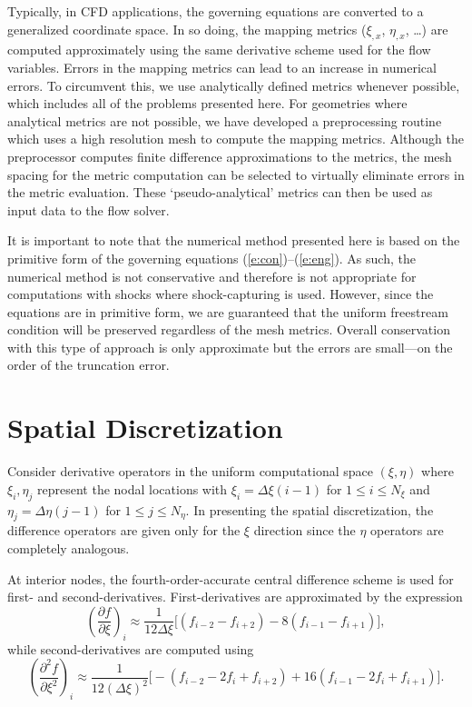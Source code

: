 Typically, in CFD applications, the governing equations are converted to a
generalized coordinate space.  In so doing, the mapping metrics ($\xi_{,x}$,
$\eta_{,x}$, \ldots) are computed approximately using the same derivative
scheme used for the flow variables.  Errors in the mapping metrics can lead to
an increase in numerical errors.  To circumvent this, we use analytically
defined metrics whenever possible, which includes all of the problems
presented here. For geometries where analytical metrics are not possible, we
have developed a preprocessing routine which uses a high resolution mesh to
compute the mapping metrics.  Although the preprocessor computes finite
difference approximations to the metrics, the mesh spacing for the metric
computation can be selected to virtually eliminate errors in the metric
evaluation.  These `pseudo-analytical' metrics can then be used as input data
to the flow solver.

It is important to note that the numerical method presented here is based on
the primitive form of the governing equations (\ref{e:con})--(\ref{e:eng}).
As such, the numerical method is not conservative and therefore is not
appropriate for computations with shocks where shock-capturing is used.
However, since the equations are in primitive form, we are guaranteed that the
uniform freestream condition will be preserved regardless of the mesh metrics.
Overall conservation with this type of approach is only approximate but the
errors are small---on the order of the truncation error.

\section{Spatial Discretization \label{s:spacedisc}}

Consider derivative operators in the uniform computational space $(\xi,\eta)$
where $\xi_i,\eta_j$ represent the nodal locations with $\xi_i = \Delta \xi
(i-1)$ for $1 \leq i \leq N_\xi$ and $\eta_j = \Delta \eta (j-1)$ for $1 \leq
j \leq N_\eta$.  In presenting the spatial discretization, the difference
operators are given only for the $\xi$ direction since the $\eta$ operators
are completely analogous.

At interior nodes, the fourth-order-accurate central difference scheme is used
for first- and second-derivatives.  First-derivatives are approximated by the
expression
%
\begin{equation} \label{e:1st}
 \left( \frac{\partial f}{\partial \xi} \right)_i \approx 
 \frac{1}{12\Delta\xi} \Big[   \left( f_{i-2} - f_{i+2} \right) -
                             8 \left( f_{i-1} - f_{i+1} \right) \Big] ,
\end{equation}
%
while second-derivatives are computed using
%
\begin{equation} \label{e:2nd}
 \left( \frac{\partial^2 f}{\partial \xi^2} \right)_i \approx 
 \frac{1}{12 (\Delta\xi)^2} 
 \Big[  - \left( f_{i-2} - 2 f_{i} + f_{i+2} \right) +
       16 \left( f_{i-1} - 2 f_{i} + f_{i+1} \right) \Big] .
\end{equation}

